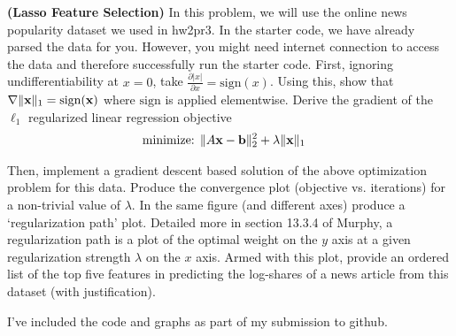 \documentclass[12pt,letterpaper,fleqn]{hmcpset}
\begin{document}
\begin{problem}[2]
\textbf{(Lasso Feature Selection)} 
In this problem, we will use the online news popularity dataset we used in hw2pr3. In the starter code, we have already parsed the data for you. However, you might need internet connection to access the data and therefore successfully run the starter code.
\newline
\newline
First, ignoring undifferentiability at $x=0$, take $\frac{\partial |x|}{\partial x}
= \mathrm{sign} (x)$. Using this, show that $\nabla \|{\bf x}\|_1 = \mathrm{sign}({\bf x})$ where $\mathrm{sign}$ is applied
elementwise. Derive the gradient of the $\ell_1$ regularized linear regression objective
\begin{align*}
    \text{minimize: } & \|A{\bf x} - {\bf b}\|_2^2 + \lambda \|{\bf x}\|_1
\end{align*}

Then, implement a gradient descent based solution of the above optimization problem for this data. Produce
the convergence plot (objective vs. iterations) for a non-trivial value of $\lambda$.
In the same figure (and different axes) produce a `regularization path' plot. Detailed
more in section 13.3.4 of Murphy, a regularization path is a plot of the optimal weight on
the $y$ axis at a given regularization strength $\lambda$ on the $x$ axis. Armed with this
plot, provide an ordered list of the top five features in predicting the log-shares of a news
article from this dataset (with justification).
\end{problem}
\begin{solution}
I've included the code and graphs as part of my submission to github. 
\end{solution}
\newpage
\end{document}

